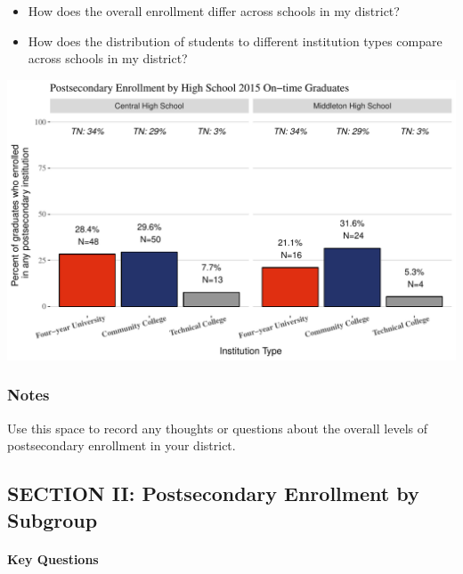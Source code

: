 \documentclass[11pt,]{article}
\providecommand{\tightlist}{%
  \setlength{\itemsep}{0pt}\setlength{\parskip}{0pt}}
\let\oldparagraph\paragraph
\renewcommand{\paragraph}[1]{\oldparagraph{#1}\mbox{}}
\begin{document}
\begin{itemize}
\tightlist
\item
  How does the overall enrollment differ across schools in my district?
\item
  How does the distribution of students to different institution types
  compare across schools in my district?
\end{itemize}

\includegraphics{20170411_PSWRR_no_CTE_files/figure-latex/Enrollment by School-1.pdf}

\subsubsection{Notes}\label{notes}

Use this space to record any thoughts or questions about the overall
levels of postsecondary enrollment in your district.

\newpage 

\subsection{SECTION II: Postsecondary Enrollment by
Subgroup}\label{section-ii-postsecondary-enrollment-by-subgroup}

\paragraph{Key Questions}\label{key-questions-2}
\end{document}
